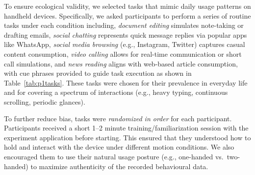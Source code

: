 To ensure ecological validity, we selected tasks that mimic daily usage patterns on handheld devices. Specifically, we asked participants to perform a series of routine tasks under each condition including, \emph{document editing} simulates note-taking or drafting emails, \emph{social chatting} represents quick message replies via popular apps like WhatsApp, \emph{social media browsing} (e.g., Instagram, Twitter) captures casual content consumption, \emph{video calling} allows for real-time communication or short call simulations, and \emph{news reading} aligns with web-based article consumption, with cue phrases provided to guide task execution as shown in Table~\ref{tab:p1tasks}. These tasks were chosen for their prevalence in everyday life and for covering a spectrum of interactions (e.g., heavy typing, continuous scrolling, periodic glances). 

To further reduce bias, tasks were \emph{randomized in order} for each participant. Participants received a short 1--2 minute training/familiarization session with the experiment application before starting. This ensured that they understood how to hold and interact with the device under different motion conditions. We also encouraged them to use their natural usage posture (e.g., one-handed vs.\ two-handed) to maximize authenticity of the recorded behavioural data.

\begin{table}[!htbp]
\centering
{}
\caption{Cue Phrases for switching tasks}\label{tab:p1tasks}
\end{table}

